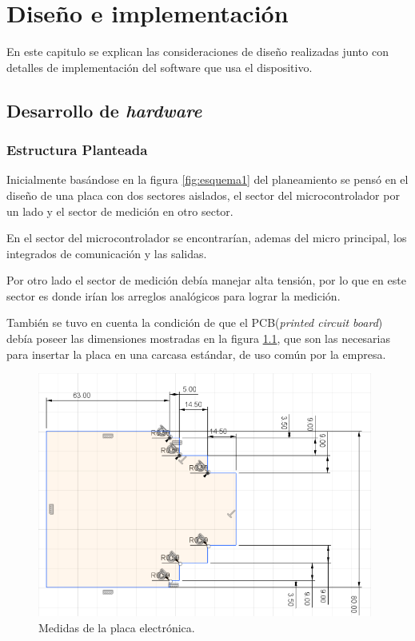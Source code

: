 \chapter{Diseño e implementación} %

En este capitulo se explican las consideraciones de diseño realizadas junto con detalles de implementación del software que usa el dispositivo.
\label{Chapter3} 

\section{Desarrollo de \textit{hardware}}
 
\subsection{Estructura Planteada }

Inicialmente basándose en la figura \ref{fig:esquema1} del planeamiento  se pensó en el diseño de una placa con dos sectores aislados, el sector del microcontrolador por un lado y el sector de medición en otro sector.

En el sector del microcontrolador se encontrarían, ademas del micro principal, los integrados de comunicación y las salidas.

Por otro lado el sector de medición debía manejar alta tensión, por lo que en este sector es donde irían los arreglos analógicos para lograr la medición. 

También se tuvo en cuenta la condición de que el PCB(\textit{printed circuit board}) debía poseer las dimensiones mostradas en la figura \ref{fig:medidaspcb}, que son las necesarias para insertar la placa en una carcasa estándar, de uso común por la empresa.

\begin{figure}[h]
	\centering
	\includegraphics[width=110mm,keepaspectratio]{Figures/Placa1v6.png}
	\caption{Medidas de la placa electrónica.}
	\label{fig:medidaspcb}
\end{figure}


